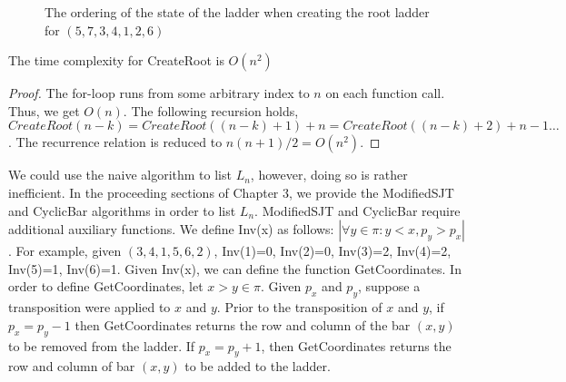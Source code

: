 \begin{figure}[t]
        

        

        
    
    \caption{The ordering of the state of the ladder when creating the root ladder for $(5,7,3,4,1,2,6)$}
    \label{Fig:CreateRoot}
\end{figure}

\begin{lemma}
	The time complexity for CreateRoot is $O(n^{2})$
\end{lemma}
\begin{proof}
	The for-loop runs from some arbitrary index to $n$ on each function call. Thus, we get $O(n)$. The following 
    recursion holds, $CreateRoot(n-k) = CreateRoot((n-k)+1) + n=CreateRoot((n-k)+2) + n-1\dots $. The recurrence 
    relation is reduced to $n(n+1)/2= O(n^2)$.
\end{proof}


We could use the naive algorithm to list $L_{n}$, however, doing so is rather inefficient. 
In the proceeding sections of Chapter 3, we provide the {\sc ModifiedSJT} and {\sc CyclicBar} algorithms in order to list $L_{n}$. 
{\sc ModifiedSJT} and {\sc CyclicBar} require additional auxiliary functions. We define {\sc Inv(x)} as follows: $|\forall y \in \pi : y < x, p_{y}>p_{x}|$. 
For example, given $(3,4,1,5,6,2)$, {\sc Inv(1)=0}, {\sc Inv(2)=0}, {\sc Inv(3)=2}, {\sc Inv(4)=2}, {\sc Inv(5)=1}, {\sc Inv(6)=1}. 
Given {\sc Inv(x)}, 
we can define the function {\sc GetCoordinates}. In order to define {\sc GetCoordinates}, let $x>y \in \pi$. Given 
$p_{x}$ and $p_{y}$, suppose a transposition were applied to $x$ and $y$. Prior to the transposition 
of $x$ and $y$, if $p_{x} = p_{y}-1$ then {\sc GetCoordinates} returns the row and column of the bar $(x,y)$ to be removed 
from the ladder. If $p_{x}=p_{y}+1$, then {\sc GetCoordinates} returns 
the row and column of bar $(x,y)$ to be added to the ladder. 





